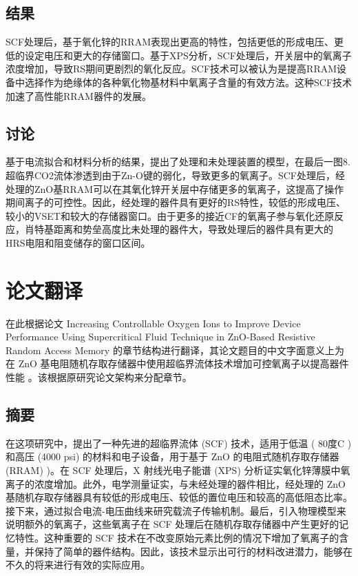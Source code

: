 \subsection{结果}

SCF处理后，基于氧化锌的RRAM表现出更高的特性，包括更低的形成电压、更低的设定电压和更大的存储窗口。基于XPS分析，SCF处理后，开关层中的氧离子浓度增加，导致RS期间更剧烈的氧化反应。SCF技术可以被认为是提高RRAM设备中选择作为绝缘体的各种氧化物基材料中氧离子含量的有效方法。这种SCF技术加速了高性能RRAM器件的发展。

\subsection{讨论}

基于电流拟合和材料分析的结果，提出了处理和未处理装置的模型，在最后一图8.超临界CO2流体渗透到由于Zn-O键的弱化，导致更多的氧离子。SCF处理后，经处理的ZnO基RRAM可以在其氧化锌开关层中存储更多的氧离子，这提高了操作期间离子的可控性。因此，经处理的器件具有更好的RS特性，较低的形成电压、较小的VSET和较大的存储器窗口。由于更多的接近CF的氧离子参与氧化还原反应，肖特基距离和势垒高度比未处理的器件大，导致处理后的器件具有更大的HRS电阻和阻变储存的窗口区间。

\section{论文翻译}

在此根据论文 Increasing Controllable Oxygen Ions to Improve Device Performance Using Supercritical Fluid Technique in ZnO-Based Resistive Random Access Memory  的章节结构进行翻译，其论文题目的中文字面意义上为在 ZnO 基电阻随机存取存储器中使用超临界流体技术增加可控氧离子以提高器件性能 。该根据原研究论文架构来分配章节。

\subsection{摘要}

在这项研究中，提出了一种先进的超临界流体 (SCF) 技术，适用于低温 ( 80度C ) 和高压 (4000 psi) 的材料和电子设备，用于基于 ZnO 的电阻式随机存取存储器 (RRAM) )。在 SCF 处理后，X 射线光电子能谱 (XPS) 分析证实氧化锌薄膜中氧离子的浓度增加。此外，电学测量证实，与未经处理的器件相比，经处理的 ZnO 基随机存取存储器具有较低的形成电压、较低的置位电压和较高的高低阻态比率。接下来，通过拟合电流-电压曲线来研究载流子传输机制。最后，引入物理模型来说明额外的氧离子，这些氧离子在 SCF 处理后在随机存取存储器中产生更好的记忆特性。这种重要的 SCF 技术在不改变原始元素比例的情况下增加了氧离子的含量，并保持了简单的器件结构。因此，该技术显示出可行的材料改进潜力，能够在不久的将来进行有效的实际应用。

